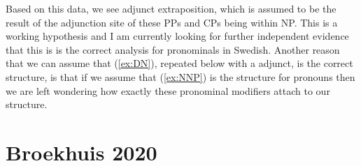 \documentclass[12pt, letterpaper]{article}
\begin{document}
\ex Based on this data, we see adjunct extraposition, which is assumed to be the result of the adjunction site of these PPs and CPs being within NP.
	\ea This is a working hypothesis and I am currently looking for further independent evidence that this is is the correct analysis for pronominals in Swedish.
	\z 
\ex Another reason that we can assume that (\ref{ex:DN}), repeated below with a adjunct, is the correct structure, is that if we assume that (\ref{ex:NNP}) is the structure for pronouns then we are left wondering how exactly these pronominal modifiers attach to our structure.
	\ea {}
	\z 
\z 


\section{Broekhuis 2020} \label{sec:BROEKHUIS}
\end{document}
